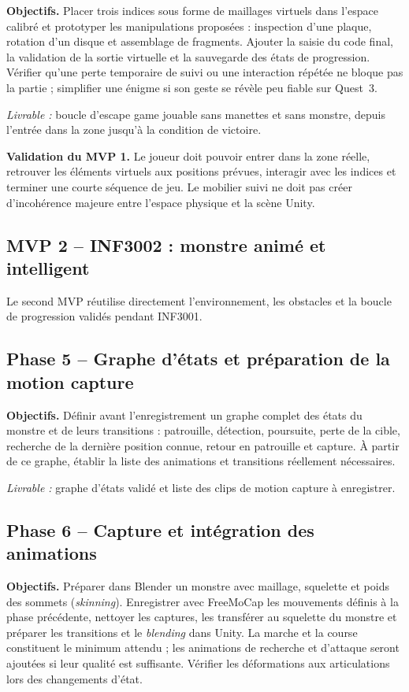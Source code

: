 \documentclass[11pt,a4paper]{article}
\begin{document}
\textbf{Objectifs.} Placer trois indices sous forme de maillages virtuels dans l'espace calibré et prototyper les manipulations proposées : inspection d'une plaque, rotation d'un disque et assemblage de fragments. Ajouter la saisie du code final, la validation de la sortie virtuelle et la sauvegarde des états de progression. Vérifier qu'une perte temporaire de suivi ou une interaction répétée ne bloque pas la partie ; simplifier une énigme si son geste se révèle peu fiable sur Quest~3.

\textit{Livrable :} boucle d'escape game jouable sans manettes et sans monstre, depuis l'entrée dans la zone jusqu'à la condition de victoire.

\textbf{Validation du MVP 1.} Le joueur doit pouvoir entrer dans la zone réelle, retrouver les éléments virtuels aux positions prévues, interagir avec les indices et terminer une courte séquence de jeu. Le mobilier suivi ne doit pas créer d'incohérence majeure entre l'espace physique et la scène Unity.

\subsection*{MVP 2 -- INF3002 : monstre animé et intelligent}

Le second MVP réutilise directement l'environnement, les obstacles et la boucle de progression validés pendant INF3001.

\subsection*{Phase 5 -- Graphe d'états et préparation de la motion capture}

\textbf{Objectifs.} Définir avant l'enregistrement un graphe complet des états du monstre et de leurs transitions : patrouille, détection, poursuite, perte de la cible, recherche de la dernière position connue, retour en patrouille et capture. À partir de ce graphe, établir la liste des animations et transitions réellement nécessaires.

\textit{Livrable :} graphe d'états validé et liste des clips de motion capture à enregistrer.

\subsection*{Phase 6 -- Capture et intégration des animations}

\textbf{Objectifs.} Préparer dans Blender un monstre avec maillage, squelette et poids des sommets (\emph{skinning}). Enregistrer avec FreeMoCap les mouvements définis à la phase précédente, nettoyer les captures, les transférer au squelette du monstre et préparer les transitions et le \emph{blending} dans Unity. La marche et la course constituent le minimum attendu ; les animations de recherche et d'attaque seront ajoutées si leur qualité est suffisante. Vérifier les déformations aux articulations lors des changements d'état.
\end{document}
